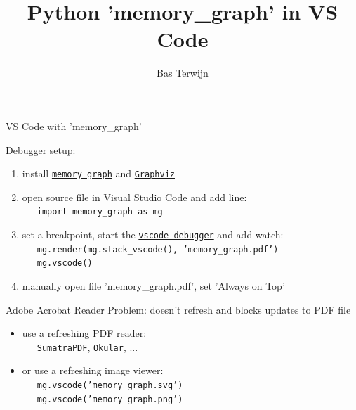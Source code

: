 \documentclass[10pt, colorlinks=true, urlcolor=blue]{beamer}
\title{Python 'memory\_graph' in VS Code}
\author{Bas Terwijn}
\date{}
\begin{document}
\begin{frame}
    \titlepage
\end{frame}

\begin{frame}{VS Code with 'memory\_graph'}

  Debugger setup:
  \begin{enumerate}
  \item install \href{https://pypi.org/project/memory-graph/}{\texttt{memory\_graph}} and \href{https://graphviz.org/download/}{\texttt{Graphviz}}
  \item open source file in Visual Studio Code and add line: \\
    \ \ \ {\footnotesize \texttt{import memory_graph as mg}}
  \item set a breakpoint, start the \href{https://code.visualstudio.com/docs/python/debugging}{\texttt{vscode debugger}} and add watch: \\
    \ \ \ {\footnotesize \texttt{mg.render(mg.stack_vscode(), 'memory_graph.pdf')}} \\
    \ \ \ {\footnotesize \texttt{mg.vscode()}}
  \item manually open file 'memory\_graph.pdf',  set 'Always on Top'
  \end{enumerate}
  
  \vspace{1.8em}
  
  Adobe Acrobat Reader Problem: doesn't refresh and blocks updates to PDF file
  \begin{itemize}
  \item use a refreshing PDF reader: \\ \ \ \
    \href{https://www.sumatrapdfreader.org/}{\texttt{SumatraPDF}},
    \href{https://okular.kde.org/}{\texttt{Okular}}, ...
  \item or use a refreshing image viewer: \\
\ \ \ {\footnotesize \texttt{mg.vscode('memory_graph.svg')}} \\
\ \ \ {\footnotesize \texttt{mg.vscode('memory_graph.png')}}
  \end{itemize}
\end{frame}
\end{document}

